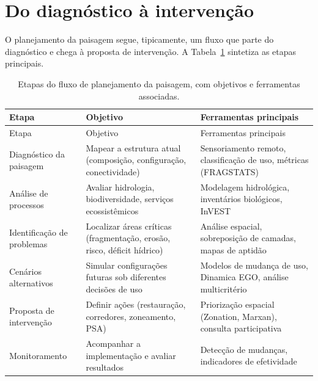 \documentclass[
  portuguese,
  11pt,
  a4paper,
  open=any]{scrbook}
\begin{document}
\section{Do diagnóstico à
intervenção}\label{do-diagnuxf3stico-uxe0-intervenuxe7uxe3o}

O planejamento da paisagem segue, tipicamente, um fluxo que parte do
diagnóstico e chega à proposta de intervenção. A
Tabela~\ref{tbl-fluxo-planejamento} sintetiza as etapas principais.

\begin{longtable}[]{@{}
  >{\raggedright\arraybackslash}p{}
  >{\raggedright\arraybackslash}p{}
  >{\raggedright\arraybackslash}p{}@{}}
\caption{Etapas do fluxo de planejamento da paisagem, com objetivos e
ferramentas associadas.}\label{tbl-fluxo-planejamento}\tabularnewline
\toprule\noalign{}
\begin{minipage}[b]{\linewidth}\raggedright
Etapa
\end{minipage} & \begin{minipage}[b]{\linewidth}\raggedright
Objetivo
\end{minipage} & \begin{minipage}[b]{\linewidth}\raggedright
Ferramentas principais
\end{minipage} \\
\midrule\noalign{}
\endfirsthead
\toprule\noalign{}
\begin{minipage}[b]{\linewidth}\raggedright
Etapa
\end{minipage} & \begin{minipage}[b]{\linewidth}\raggedright
Objetivo
\end{minipage} & \begin{minipage}[b]{\linewidth}\raggedright
Ferramentas principais
\end{minipage} \\
\midrule\noalign{}
\endhead
\bottomrule\noalign{}
\endlastfoot
Diagnóstico da paisagem & Mapear a estrutura atual (composição,
configuração, conectividade) & Sensoriamento remoto, classificação de
uso, métricas (FRAGSTATS) \\
Análise de processos & Avaliar hidrologia, biodiversidade, serviços
ecossistêmicos & Modelagem hidrológica, inventários biológicos,
InVEST \\
Identificação de problemas & Localizar áreas críticas (fragmentação,
erosão, risco, déficit hídrico) & Análise espacial, sobreposição de
camadas, mapas de aptidão \\
Cenários alternativos & Simular configurações futuras sob diferentes
decisões de uso & Modelos de mudança de uso, Dinamica EGO, análise
multicritério \\
Proposta de intervenção & Definir ações (restauração, corredores,
zoneamento, PSA) & Priorização espacial (Zonation, Marxan), consulta
participativa \\
Monitoramento & Acompanhar a implementação e avaliar resultados &
Detecção de mudanças, indicadores de efetividade \\
\end{longtable}
\end{document}
